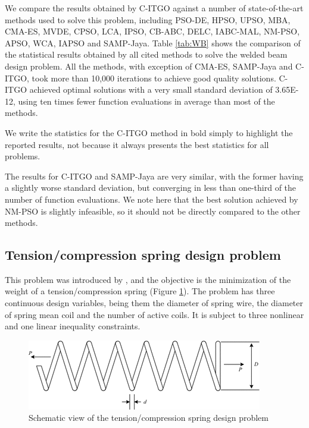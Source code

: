 We compare the results obtained by C-ITGO against a number of state-of-the-art methods used to solve this problem, including PSO-DE, HPSO, UPSO, MBA, CMA-ES, MVDE, CPSO, LCA, IPSO, CB-ABC, DELC, IABC-MAL, NM-PSO, APSO, WCA, IAPSO and SAMP-Jaya. Table \ref{tab:WB} shows the comparison of the statistical results obtained by all cited methods to solve the welded beam design problem. All the methods, with exception of CMA-ES, SAMP-Jaya and C-ITGO, took more than 10,000 iterations to achieve good quality solutions. C-ITGO achieved optimal solutions with a very small standard deviation of 3.65E-12, using ten times fewer function evaluations in average than most of the methods.

We write the statistics for the C-ITGO method in bold simply to highlight the reported results, not because it always presents the best statistics for all problems.



The results for C-ITGO and SAMP-Jaya are very similar, with the former having a slightly worse standard deviation, but converging in less than one-third of the number of function evaluations. We note here that the best solution achieved by NM-PSO is slightly infeasible, so it should not be directly compared to the other methods.




\subsection{Tension/compression spring design problem}

This problem was introduced by \cite{TC}, and the objective is the minimization of the weight of a tension/compression spring (Figure \ref{fig:TC}). The problem has three continuous design variables, being them the diameter of spring wire, the diameter of spring mean coil and the number of active coils. It is subject to three nonlinear and one linear inequality constraints.

\begin{figure}[h]
\begin{center}
\includegraphics[scale=0.6]{Imgs/TC.png}
\end{center}
\captionsetup{justification=centering}
\caption{Schematic view of the tension/compression spring design problem}\label{fig:TC}
\end{figure}


